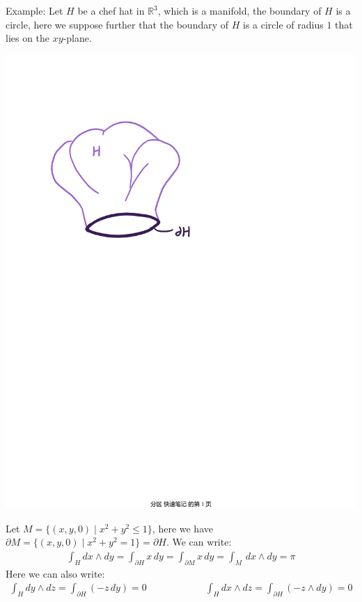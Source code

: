 \documentclass[11pt,oneside]{book}
\theoremstyle{break}
\theoremstyle{break}
\newcommand{\R}{\mathbb{R}}
\newcommand{\pd}{\partial}
\newcommand{\example}{\color{green}Example: \color{black}}
\begin{document}
\example
Let $H$ be a chef hat in $\R^3$, which is a manifold, the boundary of $H$ is a circle, here we suppose further that the boundary of $H$ is a circle of radius $1$ that lies on the $xy$-plane.\\ 
\begin{center}
\includegraphics[scale=0.65]{chef-hat.pdf}
\end{center}
Let $M = \{ (x,y,0) \mid x^2 + y^2 \leq 1\}$, here we have $\pd M = \{ (x,y,0) \mid x^2 + y^2 = 1\} = \pd H$. We can write:
\begin{align*}
 \int_{H} dx\wedge dy = \int_{\pd H} x \, dy=\int_{\pd M} x \, dy = \int_{M}\, dx \wedge dy = \pi
\end{align*}
Here we can also write:
\begin{align*}
\int_{H} dy \wedge dz = \int_{\pd H} ( -z \, dy) = 0 \qquad\qquad\qquad \int_{H}dx \wedge dz = \int_{\pd H} (-z \wedge dy) = 0
\end{align*}
\hfill\break\hfill\break
\end{document}
